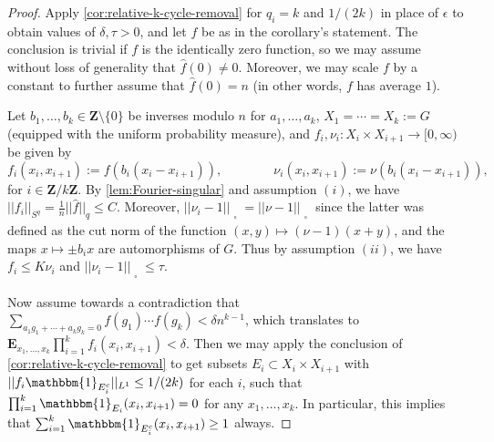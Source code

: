 \documentclass[reqno,11pt]{amsart}
\theoremstyle{definition}
\theoremstyle{remark}
\numberwithin{equation}{section}
\newcommand{\Z}{\mathbf{Z}}
\newcommand{\E}{\mathbf{E}}
\newcommand{\one}{\mathbbm{1}}
\renewcommand{\hat}{\widehat}
\newcommand{\sq}{_{\substack{ \\ \square}}}
\begin{document}
\begin{proof}
Apply \cref{cor:relative-k-cycle-removal} for $q_i = k$ and $1/(2k)$ in place of $\epsilon$ to obtain values of $\delta, \tau > 0$, and let $f$ be as in the corollary's statement. The conclusion is trivial if $f$ is the identically zero function, so we may assume without loss of generality that $\hat{f}(0) \neq 0$. Moreover, we may scale $f$ by a constant to further assume that $\hat{f}(0) = n$ (in other words, $f$ has average $1$). 

Let $b_1, \ldots, b_k \in \Z \setminus \{0\}$ be inverses modulo $n$ for $a_1, \ldots, a_k$, $X_1 = \cdots = X_k := G$ (equipped with the uniform probability measure), and $f_i, \nu_i : X_i \times X_{i+1} \to [0, \infty)$ be given by
\[
    f_i(x_i, x_{i+1}) := f(b_i(x_i - x_{i+1})), 
    \qquad\qquad 
    \nu_i(x_i, x_{i+1}) := \nu(b_i(x_i - x_{i+1})),
\]
for $i \in \Z/k\Z$. By \cref{lem:Fourier-singular} and assumption $(i)$, we have $||f_i||_{S^q} = \frac{1}{n} ||\hat{f}||_{q} \le C$. Moreover, $||\nu_i - 1||\sq = ||\nu - 1||\sq$ since the latter was defined as the cut norm of the function $(x, y) \mapsto (\nu-1)(x+y)$, and the maps $x \mapsto \pm b_i x$ are automorphisms of $G$. Thus by assumption $(ii)$, we have $f_i\le K \nu_i$ and $||\nu_i - 1||\sq \le \tau$.

Now assume towards a contradiction that $\sum_{a_1 g_1 + \cdots + a_k g_k = 0} f(g_1) \cdots f(g_k) < \delta n^{k-1}$, which translates to $\E_{x_1, \ldots, x_k} \prod_{i=1}^k f_i(x_i, x_{i+1}) < \delta$. Then we may apply the conclusion of \cref{cor:relative-k-cycle-removal} to get subsets $E_i \subset X_i \times X_{i+1}$ with $||f_i \one_{E_i^c}||_{L^1} \le 1/(2k)$ for each $i$, such that $\prod_{i=1}^k \one_{E_i}(x_i, x_{i+1}) = 0$ for any $x_1, \ldots, x_k$. In particular, this implies that $\sum_{i=1}^k \one_{E_i^c} (x_i, x_{i+1}) \ge 1$ always.


\end{proof}
\end{document}
